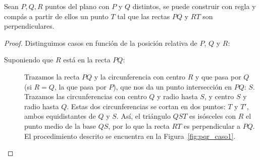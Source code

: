 \begin{lema}\label{lema:perpendicular}
    Sean $P,Q,R$ puntos del plano con $P$ y $Q$ distintos, se puede construir con regla y compás a partir de ellos un punto $T$  tal que las rectas $PQ$ y $RT$ son perpendiculares.
    \begin{proof}
        Distinguimos casos en función de la posición relativa de $P$, $Q$ y $R$:
        \begin{description}
            \item [Suponiendo que $R$ está en la recta $PQ$:] Trazamos la recta $PQ$ y la circunferencia con centro $R$ y que pasa por $Q$ (si $R=Q$, la que pasa por $P$), que nos da un punto intersección en $PQ$: $S$. Trazamos las circunferencias con centro $Q$ y radio hasta $S$, y centro $S$ y radio hasta $Q$. Estas dos circunferencias se cortan en dos puntos: $T$ y $T'$, ambos equidistantes de $Q$ y $S$. Así, el triángulo $QST$ es isósceles con $R$ el punto medio de la base $QS$, por lo que la recta $RT$ es perpendicular a $PQ$. El procedimiento descrito se encuentra en la Figura~\ref{fig:pqr_caso1}.
            \begin{figure}[h]
                \centering
\end{figure}
\end{description}
\end{proof}
\end{lema}

